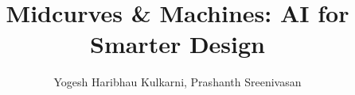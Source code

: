\documentclass[xcolor=dvipsnames,compress,t,pdf,9pt]{beamer}
\title[\insertframenumber /\inserttotalframenumber]{Midcurves \& Machines: AI for Smarter Design}
\author[YHK]{Yogesh Haribhau Kulkarni, Prashanth Sreenivasan}
\begin{document}
	\begin{frame}
	\titlepage
	\end{frame}
	
	

	
\end{document}
